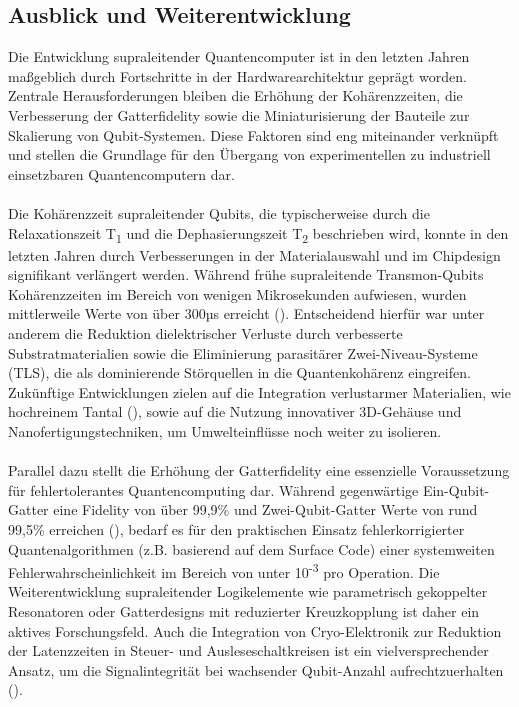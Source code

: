 \subsection{Ausblick und Weiterentwicklung}
Die Entwicklung supraleitender Quantencomputer ist in den letzten Jahren maßgeblich durch Fortschritte in der Hardwarearchitektur geprägt worden. Zentrale Herausforderungen bleiben die Erhöhung der Kohärenzzeiten, die Verbesserung der Gatterfidelity sowie die Miniaturisierung der Bauteile zur Skalierung von Qubit-Systemen. Diese Faktoren sind eng miteinander verknüpft und stellen die Grundlage für den Übergang von experimentellen zu industriell einsetzbaren Quantencomputern dar.\\\\
Die Kohärenzzeit supraleitender Qubits, die typischerweise durch die Relaxationszeit T\textsubscript{1} und die Dephasierungszeit T\textsubscript{2} beschrieben wird, konnte in den letzten Jahren durch Verbesserungen in der Materialauswahl und im Chipdesign signifikant verlängert werden. Während frühe supraleitende Transmon-Qubits Kohärenzzeiten im Bereich von wenigen Mikrosekunden aufwiesen, wurden mittlerweile Werte von über 300µs erreicht (\cite{wangPracticalQuantumComputers2022}). Entscheidend hierfür war unter anderem die Reduktion dielektrischer Verluste durch verbesserte Substratmaterialien sowie die Eliminierung parasitärer Zwei-Niveau-Systeme (TLS), die als dominierende Störquellen in die Quantenkohärenz eingreifen. Zukünftige Entwicklungen zielen auf die Integration verlustarmer Materialien, wie hochreinem Tantal (\cite{placeNewMaterialPlatform2021}), sowie auf die Nutzung innovativer 3D-Gehäuse und Nanofertigungstechniken, um Umwelteinflüsse noch weiter zu isolieren.\\\\
Parallel dazu stellt die Erhöhung der Gatterfidelity eine essenzielle Voraussetzung für fehlertolerantes Quantencomputing dar. Während gegenwärtige Ein-Qubit-Gatter eine Fidelity von über 99,9\% und Zwei-Qubit-Gatter Werte von rund 99,5\% erreichen (\cite{google_quantum_ai_suppressing_2023}), bedarf es für den praktischen Einsatz fehlerkorrigierter Quantenalgorithmen (z.B. basierend auf dem Surface Code) einer systemweiten Fehlerwahrscheinlichkeit im Bereich von unter 10\textsuperscript{-3} pro Operation. Die Weiterentwicklung supraleitender Logikelemente wie parametrisch gekoppelter Resonatoren oder Gatterdesigns mit reduzierter Kreuzkopplung ist daher ein aktives Forschungsfeld. Auch die Integration von Cryo-Elektronik zur Reduktion der Latenzzeiten in Steuer- und Ausleseschaltkreisen ist ein vielversprechender Ansatz, um die Signalintegrität bei wachsender Qubit-Anzahl aufrechtzuerhalten (\cite{patraPDFCryoCMOSCircuits}).\\\\
